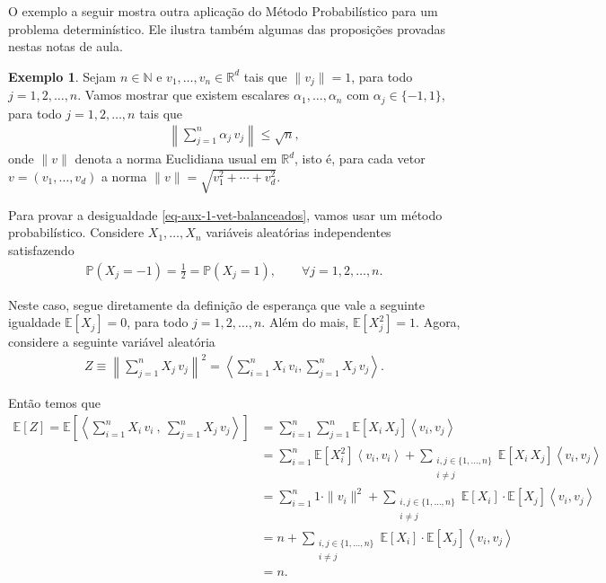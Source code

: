 \documentclass[12pt,portuguese]{article}
\theoremstyle{definition}
\newtheorem{example}[example]{Exemplo}
\begin{document}
\bigskip 

O exemplo a seguir mostra outra aplicação do Método Probabilístico para um problema
determinístico. Ele ilustra também algumas das proposições provadas nestas notas de aula.


\begin{example}
Sejam $n\in\mathbb{N}$ e $v_1,\ldots,v_n\in\mathbb{R}^d$ tais que $\|v_j\|=1$, 
para todo $j=1,2,\ldots,n$. Vamos mostrar que existem escalares 
$\alpha_1,\ldots,\alpha_n$ com $\alpha_j\in \{-1,1\}$, para todo $j=1,2,\ldots,n$
tais que 
\begin{align}\label{eq-aux-1-vet-balanceados}
\left\| \sum_{j=1}^n \alpha_j\, v_j\right\| \leqslant \sqrt{n},
\end{align}
onde $\|v\|$ denota a norma Euclidiana usual em $\mathbb{R}^d$, isto é, 
para cada vetor $v=(v_1,\ldots,v_d)$ a norma
$\|v\|= \sqrt{v_1^2+\cdots+v_d^2}$.

Para provar a desigualdade \eqref{eq-aux-1-vet-balanceados}, vamos usar um método probabilístico.
Considere $X_1,\ldots,X_n$ variáveis aleatórias independentes satisfazendo 
\begin{align*}
\mathbb{P}(X_j=-1)= \frac{1}{2}= \mathbb{P}(X_j=1),
\qquad \forall j=1,2,\ldots,n. 
\end{align*}

Neste caso, segue diretamente da definição de esperança que vale a seguinte
igualdade $\mathbb{E}[X_j]=0$, para todo $j=1,2,\ldots, n$.
Além do mais, $\mathbb{E}[X_j^2]=1$.
Agora, considere a seguinte variável aleatória 
\begin{align*}
Z
\equiv 
\left\| \sum_{j=1}^n X_j\, v_j\right\|^2 
= 
\left\langle \sum_{i=1}^n X_i\, v_i ,  \sum_{j=1}^n X_j\, v_j \right\rangle.
\end{align*}

Então temos que 
\begin{align*}
\mathbb{E}[Z] 
= 
\mathbb{E}\left[ \left\langle \sum_{i=1}^n X_i\, v_i\ , \ \sum_{j=1}^n X_j\, v_j \right\rangle  \right]
&= 
\sum_{i=1}^n \sum_{j=1}^n  \mathbb{E}[X_i\, X_j] \left\langle  v_i , v_j \right\rangle
\\[0.3cm]
&= 
\sum_{i=1}^n \mathbb{E}[X_i^2] \left\langle  v_i , v_i \right\rangle
+
\sum_{ \substack{i,j\in \{1,\ldots, n\} \\ i\neq j } } \mathbb{E}[X_i\, X_j] \left\langle  v_i , v_j \right\rangle
\\[0.3cm]
&= 
\sum_{i=1}^n 1\cdot \|v_i\|^2
+
\sum_{ \substack{i,j\in \{1,\ldots, n\} \\ i\neq j } } \mathbb{E}[X_i] \cdot \mathbb{E}[X_j] \left\langle  v_i , v_j \right\rangle
\\[0.3cm]
&= 
n
+
\sum_{ \substack{i,j\in \{1,\ldots, n\} \\ i\neq j } } \mathbb{E}[X_i] \cdot \mathbb{E}[X_j] \left\langle  v_i , v_j \right\rangle
\\[0.3cm]
&= 
n.
\end{align*}


\end{example}
\end{document}
